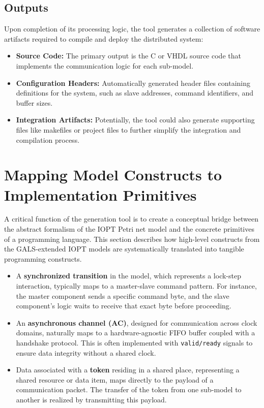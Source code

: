\subsection{Outputs}
Upon completion of its processing logic, the tool generates a collection of software artifacts required to compile and deploy the distributed system:
\begin{itemize}
    \item \textbf{Source Code:} The primary output is the C or VHDL source code that implements the communication logic for each sub-model.
    \item \textbf{Configuration Headers:} Automatically generated header files containing definitions for the system, such as slave addresses, command identifiers, and buffer sizes.
    \item \textbf{Integration Artifacts:} Potentially, the tool could also generate supporting files like makefiles or project files to further simplify the integration and compilation process.
\end{itemize}

\section{Mapping Model Constructs to Implementation Primitives}
\label{sec:mapping_constructs}

A critical function of the generation tool is to create a conceptual bridge between the abstract formalism of the IOPT Petri net model and the concrete primitives of a programming language. This section describes how high-level constructs from the GALS-extended IOPT models are systematically translated into tangible programming constructs.

\begin{itemize}
    \item A \textbf{synchronized transition} in the model, which represents a lock-step interaction, typically maps to a master-slave command pattern. For instance, the master component sends a specific command byte, and the slave component's logic waits to receive that exact byte before proceeding.
    \item An \textbf{asynchronous channel (AC)}, designed for communication across clock domains, naturally maps to a hardware-agnostic FIFO buffer coupled with a handshake protocol. This is often implemented with \texttt{valid/ready} signals to ensure data integrity without a shared clock.
    \item Data associated with a \textbf{token} residing in a shared place, representing a shared resource or data item, maps directly to the payload of a communication packet. The transfer of the token from one sub-model to another is realized by transmitting this payload.
\end{itemize}

